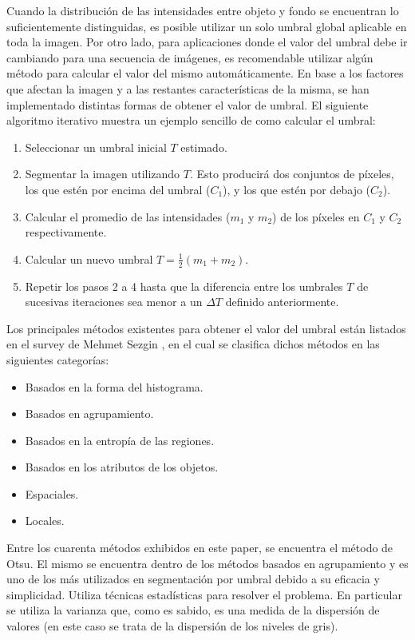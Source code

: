 Cuando la distribución de las intensidades entre objeto y fondo se encuentran lo suficientemente distinguidas, es posible utilizar un solo umbral global aplicable en toda la imagen. Por otro lado, para aplicaciones donde el valor del umbral debe ir cambiando para una secuencia de imágenes, es recomendable utilizar algún método para calcular el valor del mismo automáticamente. En base a los factores que afectan la imagen y a las restantes características de la misma, se han implementado distintas formas de obtener el valor de umbral. El siguiente algoritmo iterativo muestra un ejemplo sencillo de como calcular el umbral:

\begin{enumerate}
\item Seleccionar un umbral inicial $T$ estimado.
\item Segmentar la imagen utilizando $T$. Esto producirá dos conjuntos de píxeles, los que estén por encima del umbral ($C_1$), y los que estén por debajo ($C_2$).
\item Calcular el promedio de las intensidades ($m_1$ y $m_2$) de los píxeles en $C_1$ y $C_2$ respectivamente.
\item Calcular un nuevo umbral $T = \frac{1}{2}(m_1 + m_2)$.
\item Repetir los pasos 2 a 4 hasta que la diferencia entre los umbrales $T$ de sucesivas iteraciones sea menor a un ${\Delta}T$ definido anteriormente.
\end{enumerate}

Los principales métodos existentes para obtener el valor del umbral están listados en el survey de Mehmet Sezgin \cite{surveyThreshold}, en el cual se clasifica dichos métodos en las siguientes categorías:
\begin{itemize}
\item Basados en la forma del histograma.
\item Basados en agrupamiento.
\item Basados en la entropía de las regiones.
\item Basados en los atributos de los objetos.
\item Espaciales.
\item Locales.
\end{itemize}

Entre los cuarenta métodos exhibidos en este paper, se encuentra el método de Otsu\cite{otsu}. El mismo se encuentra dentro de los métodos basados en agrupamiento y es uno de los más utilizados en segmentación por umbral debido a su eficacia y simplicidad. Utiliza técnicas estadísticas para resolver el problema. En particular se utiliza la varianza que, como es sabido, es una medida de la dispersión de valores (en este caso se trata de la dispersión de los niveles de gris).

